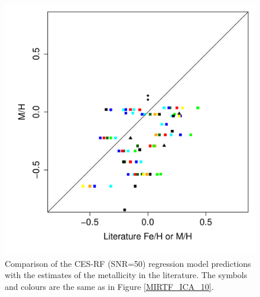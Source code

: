 \begin {figure}
\centering
\includegraphics[width=\textwidth]{figs/irtf-figs/M-CES.pdf}
\caption{Comparison of the CES-RF (SNR=50) regression model
  predictions with the estimates of the metallicity in the
  literature. The symbols and colours are the same as in Figure
  \ref{MIRTF_ICA_10}.}
\label{fig:irtf-ces-met}
\end {figure}
